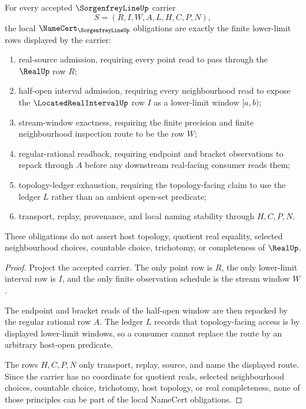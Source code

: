 \begin{theorem}
\label{thm:sorgenfrey-line-namecert-obligations}
For every accepted $\SorgenfreyLineUp$ carrier
$$
S=(R,I,W,A,L,H,C,P,N),
$$
the local $\NameCert_{\SorgenfreyLineUp}$ obligations are exactly the finite lower-limit rows displayed by the carrier:
\begin{enumerate}
\item real-source admission, requiring every point read to pass through the $\RealUp$ row $R$;
\item half-open interval admission, requiring every neighbourhood read to expose the $\LocatedRealIntervalUp$ row $I$ as a lower-limit window $[a,b)$;
\item stream-window exactness, requiring the finite precision and finite neighbourhood inspection route to be the row $W$;
\item regular-rational readback, requiring endpoint and bracket observations to repack through $A$ before any downstream real-facing consumer reads them;
\item topology-ledger exhaustion, requiring the topology-facing claim to use the ledger $L$ rather than an ambient open-set predicate;
\item transport, replay, provenance, and local naming stability through $H,C,P,N$.
\end{enumerate}
These obligations do not assert host topology, quotient real equality, selected neighbourhood choices, countable choice, trichotomy, or completeness of $\RealUp$.
\end{theorem}
\begin{proof}
Project the accepted carrier. The only point row is $R$, the only lower-limit interval row is $I$, and the only finite observation schedule is the stream window $W$.

The endpoint and bracket reads of the half-open window are then repacked by the regular rational row $A$. The ledger $L$ records that topology-facing access is by displayed lower-limit windows, so a consumer cannot replace the route by an arbitrary host-open predicate.

The rows $H,C,P,N$ only transport, replay, source, and name the displayed route. Since the carrier has no coordinate for quotient reals, selected neighbourhood choices, countable choice, trichotomy, host topology, or real completeness, none of those principles can be part of the local NameCert obligations.
\end{proof}

